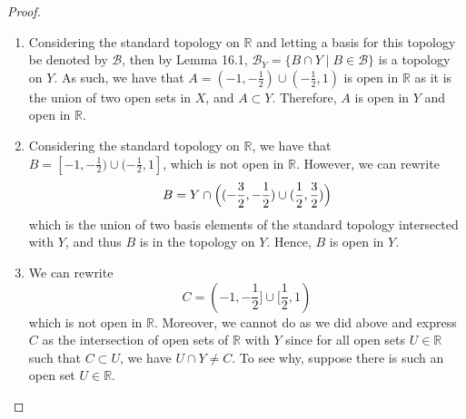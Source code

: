 \documentclass[12pt]{article}
\theoremstyle{definition}
\newcommand{\bigparen}[1]{\Bigl ( #1 \Bigr )}
\begin{document}
\begin{enumerate}
                \begin{proof}\par\hfill
                    \begin{enumerate}
                        \item Considering the standard topology on $\mathbb{R}$ and
                            letting a basis for this topology be denoted by
                            $\mathcal{B}$, then by Lemma 16.1, $\mathcal{B}_Y=\{B\cap
                            Y\mid B\in\mathcal{B}\} $ is a topology on $Y$. As such, we
                            have that $A=(-1, -\frac{1}{2})\cup(-\frac{1}{2}, 1)$ is open in $\mathbb{R}$ as it
                            is the union of two open sets in $X$, and $A\subset Y$.
                            Therefore, $A$ is open in $Y$ and open in
                            $\mathbb{R}$.
                        \item Considering the standard topology on
                            $\mathbb{R}$, we have that $B=[-1,
                            -\frac{1}{2})\cup(-\frac{1}{2},
                            1]$, which is not open in $\mathbb{R}$. However, we
                            can rewrite 
                                \begin{equation*}
                                    B=Y\cap\bigparen{(-\frac{3}{2},
                                    -\frac{1}{2})\cup(\frac{1}{2}, \frac{3}{2})}
                                \end{equation*}
                            which is the union of two basis elements of the
                            standard topology intersected with $Y$, and thus
                            $B$ is in the topology on $Y$. Hence, $B$ is open
                            in $Y$.
                        \item We can rewrite 
                                \begin{equation*}
                                    C = (-1, -\frac{1}{2}]\cup[\frac{1}{2}, 1)
                                \end{equation*}
                            which is not open in $\mathbb{R}$. Moreover, we
                            cannot do as we did above and express $C$ as the
                            intersection of open sets of $\mathbb{R}$ with $Y$
                            since for all open sets $U\in\mathbb{R}$ such that
                            $C\subset U$, we have $U\cap Y\neq C$. To see why,
                            suppose there is such an open set $U\in\mathbb{R}$.

\end{enumerate}
\end{proof}
\end{enumerate}
\end{document}
